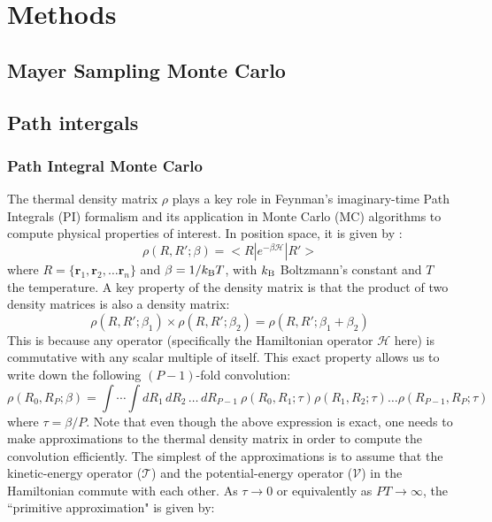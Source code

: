 \chapter{Methods}
\section{Mayer Sampling Monte Carlo}
\section{Path intergals}
    \subsection{Path Integral Monte Carlo}
        The thermal density matrix $\rho$ plays a key role in Feynman's imaginary-time Path Integrals (PI) formalism and its application in Monte Carlo (MC) algorithms to compute physical properties of interest. In position space, it is given by \cite{Feynman,Ceperley1995,Cui1997}:
        \begin{equation} \label{rho}
            \rho (R , R' ; \beta) = < R | e^{- \beta \mathcal{H} } | R' >
        \end{equation}
        where $R = \{\bm{r}_1, \bm{r}_2, \ldots \bm{r}_n\}$ and $\beta = 1/k_{\rm B}T$, with $k_{\rm B}$ Boltzmann's constant and $T$ the temperature. A key property of the density matrix is that the product of two density matrices is also a density matrix:
        \begin{equation} \label{dmProduct}
            \rho (R, R'; \beta_1) \times \rho (R, R'; \beta_2) = \rho (R, R'; \beta_1 + \beta_2)
        \end{equation}
        This is because any operator (specifically the Hamiltonian operator $\mathcal{H}$ here) is commutative with any scalar multiple of itself. This exact property allows us to write down the following $(P-1)$-fold convolution:
        \begin{equation} \label{convolution}
            \rho (R_0, R_P; \beta) = \displaystyle\int \cdots \int dR_1 \, dR_2 \, \ldots \, dR_{P-1} \: \rho (R_0, R_1; \tau) \rho (R_1, R_2; \tau) \ldots \rho (R_{P-1}, R_P; \tau)
        \end{equation}
        where $\tau = \beta/P$. Note that even though the above expression is exact, one needs to make approximations to the thermal density matrix in order to compute the convolution efficiently. The simplest of the approximations is to assume that the kinetic-energy operator ($\mathcal{T}$) and the potential-energy operator ($\mathcal{V}$) in the Hamiltonian commute with each other. As $\tau \to 0$ or equivalently as $PT \to \infty$, the ``primitive approximation" is given by:
